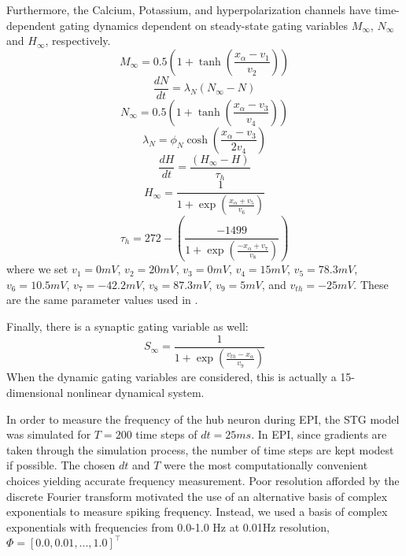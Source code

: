 \documentclass[11pt]{article}
\begin{document}
Furthermore, the Calcium, Potassium, and hyperpolarization channels have time-dependent gating dynamics dependent on steady-state gating variables $M_\infty$, $N_\infty$ and $H_\infty$, respectively.
\begin{equation}  M_{\infty} = 0.5 \left( 1 + \tanh \left( \frac{x_\alpha - v_1}{v_2} \right) \right) \end{equation}
\begin{equation}  \frac{dN}{dt} = \lambda_N (N_\infty - N)  \end{equation}
\begin{equation}  N_\infty = 0.5 \left( 1 + \tanh \left( \frac{x_\alpha - v_3}{v_4} \right) \right) \end{equation}
\begin{equation}  \lambda_N = \phi_N \cosh \left( \frac{x_\alpha - v_3}{2 v_4} \right) \end{equation}
\begin{equation}  \frac{dH}{dt} = \frac{\left( H_\infty - H \right)}{\tau_h} \end{equation}
\begin{equation}  H_\infty = \frac{1}{1 + \exp \left( \frac{x_\alpha + v_5}{v_6} \right)} \end{equation}
\begin{equation}  \tau_h = 272 - \left( \frac{-1499}{1 + \exp \left( \frac{-x_\alpha + v_7}{v_8} \right)} \right) \end{equation}
where we set $v_1 = 0mV$, $v_2  = 20mV$, $v_3 = 0mV$, $v_4 = 15mV$, $v_5 = 78.3mV$,
$v_6 = 10.5mV$, $v_7 = -42.2mV$, $v_8 = 87.3mV$, $v_9 = 5mV$, and $v_{th} = -25mV$.  These are the same parameter values used in \cite{gutierrez2013multiple}.

Finally, there is a synaptic gating variable as well:
\begin{equation} S_\infty = \frac{1}{1 + \exp \left( \frac{v_{th} - x_\alpha}{v_9} \right)} 
\end{equation}
When the dynamic gating variables are considered, this is actually a 15-dimensional nonlinear dynamical system.

In order to measure the frequency of the hub neuron during EPI, the STG model was simulated for $T = 200$ time steps of $dt = 25ms$.  In EPI, since gradients are taken through the simulation process, the number of time steps are kept modest if possible. The chosen $dt$ and $T$ were the most computationally convenient choices yielding accurate frequency measurement.  Poor resolution afforded by the discrete Fourier transform motivated the use of an alternative basis of complex exponentials to measure spiking frequency.  Instead, we used a basis of complex exponentials with frequencies from 0.0-1.0 Hz at 0.01Hz resolution, $\Phi = \left[ 0.0, 0.01, ..., 1.0 \right]^\top$
\end{document}
